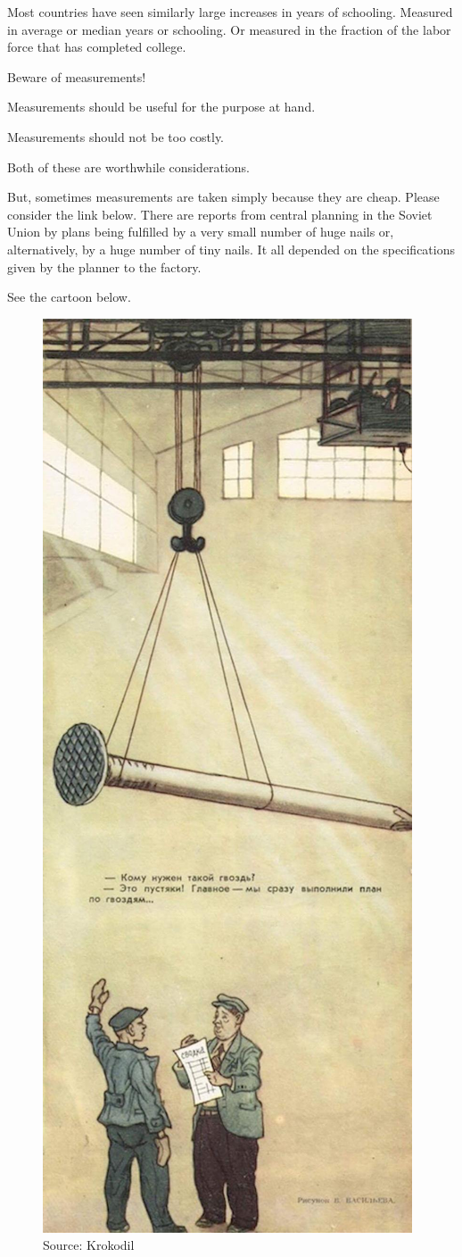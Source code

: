 \documentclass[
]{book}
\begin{document}
Most countries have seen similarly large increases in years of schooling. Measured in average or median years or schooling. Or measured in the fraction of the labor force that has completed college.

Beware of measurements!

Measurements should be useful for the purpose at hand.

Measurements should not be too costly.

Both of these are worthwhile considerations.

But, sometimes measurements are taken simply because they are cheap. Please consider the link below. There are reports from central planning in the Soviet Union by plans being fulfilled by a very small number of huge nails or, alternatively, by a huge number of tiny nails. It all depended on the specifications given by the planner to the factory.

See the cartoon below.

\begin{figure}

{\centering \includegraphics[width=0.5\linewidth]{img/growth2/sovietcartoon} 

}

\caption{Source: Krokodil}\label{fig:sovietcartoon}
\end{figure}
\end{document}
